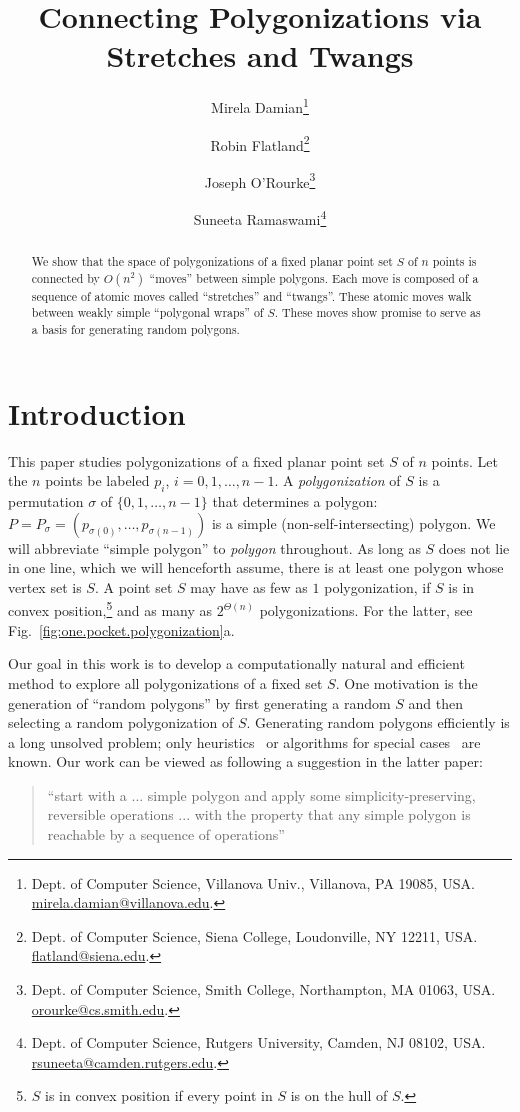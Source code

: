 \pdfoutput=1  \documentclass{article}
\title{Connecting Polygonizations via Stretches and Twangs}
\author{Mirela Damian\thanks{Dept. of Computer Science, Villanova Univ., Villanova,
    PA 19085, USA.
   \protect\url{mirela.damian@villanova.edu}.}
\and
Robin Flatland\thanks{Dept. of Computer Science, Siena College, Loudonville, NY 12211, USA.
    \protect\url{flatland@siena.edu}.}
\and
Joseph O'Rourke\thanks{Dept. of Computer Science, Smith College, Northampton, MA
      01063, USA.
      \protect\url{orourke@cs.smith.edu}.
}
\and
Suneeta Ramaswami\thanks{Dept. of Computer Science, Rutgers University,
       Camden, NJ 08102, USA.
   \protect\url{rsuneeta@camden.rutgers.edu}.}
}
\date{}
\def\s{{\sigma}}
\newcommand{\seclab}[1]{\label{sec:#1}}
\newcommand{\figref}[1]{\ref{fig:#1}}
\begin{document}
\maketitle

\begin{abstract}
\noindent We show that the space of polygonizations of a fixed
planar point set $S$ of $n$ points is connected by
$O(n^2)$ ``moves'' between simple polygons.
Each move is composed of a sequence of
atomic moves called ``stretches'' and ``twangs''.
These atomic moves walk between weakly simple
``polygonal wraps'' of $S$.
These moves show promise to serve as a basis for generating random polygons.
\end{abstract}

\maketitle

\section{Introduction}
\seclab{Introduction} This paper studies polygonizations of a fixed
planar point set $S$ of $n$ points. Let the $n$ points be labeled
$p_i$, $i=0,1,\ldots,n{-}1$. A \emph{polygonization} of $S$ is a
permutation $\s$ of $\{0,1,\ldots,n{-}1\}$ that determines a polygon:
$P = P_{\s}  = (p_{\s(0)}, \ldots, p_{\s(n{-}1)})$ is a simple
(non-self-intersecting) polygon. We will abbreviate ``simple
polygon'' to \emph{polygon} throughout.
As long as $S$ does not lie in one line, which we will henceforth assume,
there is at least one
polygon whose vertex set is $S$. A point set $S$ may have as few as
$1$ polygonization, if $S$ is in convex position,\footnote{
 $S$ is in convex position if every point in $S$ is on the hull of $S$.
}
and as many as
$2^{\Theta(n)}$ polygonizations. For the latter, see
Fig.~\figref{one.pocket.polygonization}a.

Our goal in this work is to develop a computationally natural and
efficient method to explore all polygonizations of a fixed set $S$.
One motivation is the generation of ``random polygons'' by first
generating a random $S$ and then selecting a random polygonization
of $S$. Generating random polygons efficiently is a long unsolved
problem; only heuristics~\cite{ah-hgrp-96} or algorithms for special
cases~\cite{zssm-grpgv-96} are known. Our work can be viewed as
following a suggestion in the latter paper:
\begin{quotation}
\noindent ``start with a ... simple polygon and apply some
simplicity-preserving, reversible operations ... with the property
that any simple polygon is reachable by a sequence of operations''
\end{quotation}
\end{document}
